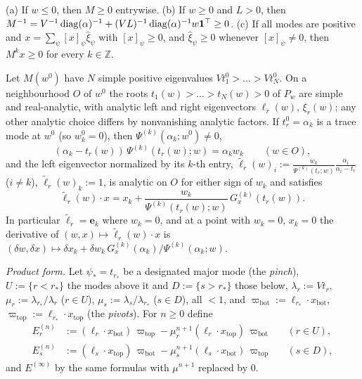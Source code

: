 \documentclass[11pt,a4paper]{report}
\newcommand{\one}{\mathbf 1}
\newcommand{\bfe}{\mathbf e}
\newcommand{\xb}{x_{\mathrm{bot}}}
\newcommand{\xt}{x_{\mathrm{top}}}
\newcommand{\piv}{\varpi}
\begin{document}
\begin{lemma}\label{lem:positive}
(a) If \(w\le0\), then \(M\ge0\) entrywise. (b) If \(w\ge0\) and \(L>0\), then
\(M^{-1}=V^{-1}\diag(\alpha)^{-1}+(VL)^{-1}\diag(\alpha)^{-1}w\one^\top\ge0\). (c) If all modes are positive and
\(x=\sum_\psi[x]_\psi\hat\xi_\psi\) with \([x]_\psi\ge0\), and \(\hat\xi_\psi\ge0\) whenever \([x]_\psi\ne0\), then \(M^kx\ge0\) for every
\(k\in\mathbb Z\).
\end{lemma}

\begin{lemma}\label{lem:analytic}
Let \(M(w^0)\) have \(N\) simple positive eigenvalues \(Vt^0_1>\dots>Vt^0_N\). On a neighbourhood \(O\) of \(w^0\) the roots
\(t_1(w)>\dots>t_N(w)>0\) of \(P_w\) are simple and real-analytic, with analytic left and right eigenvectors \(\ell_r(w)\),
\(\xi_r(w)\); any other analytic choice differs by nonvanishing analytic factors. If \(t^0_r=\alpha_k\) is a trace mode at
\(w^0\) (so \(w^0_k=0\)), then \(\Psi^{(k)}(\alpha_k;w^0)\ne0\),
\begin{equation}\label{eq:traceroot}
(\alpha_k-t_r(w))\,\Psi^{(k)}(t_r(w);w)=\alpha_kw_k\qquad(w\in O),
\end{equation}
and the left eigenvector normalized by its \(k\)-th entry,
\(\tilde\ell_r(w)_i:=\frac{w_k}{\Psi^{(k)}(t_r;w)}\frac{\alpha_i}{\alpha_i-t_r}\) (\(i\ne k\)), \(\tilde\ell_r(w)_k:=1\), is analytic on
\(O\) for either sign of \(w_k\) and satisfies
\begin{equation}\label{eq:regtrace}
\tilde\ell_r(w)\cdot x=x_k+\frac{w_k}{\Psi^{(k)}(t_r(w);w)}\,G^{(k)}_x(t_r(w)).
\end{equation}
In particular \(\tilde\ell_r=\bfe_k\) where \(w_k=0\), and at a point with \(w_k=0\), \(x_k=0\) the derivative of
\((w,x)\mapsto\tilde\ell_r(w)\cdot x\) is \((\delta w,\delta x)\mapsto\delta x_k+\delta w_k\,G^{(k)}_x(\alpha_k)/\Psi^{(k)}(\alpha_k;w)\).
\end{lemma}

\emph{Product form.} Let \(\psi_*=t_{r_*}\) be a designated major mode (the \emph{pinch}), \(U:=\{r<r_*\}\) the modes above it and
\(D:=\{s>r_*\}\) those below, \(\lambda_r:=Vt_r\), \(\mu_r:=\lambda_{r_*}/\lambda_r\) (\(r\in U\)), \(\mu_s:=\lambda_s/\lambda_{r_*}\)
(\(s\in D\)), all \(<1\), and \(\piv_{\mathrm{bot}}:=\ell_{r_*}\cdot\xb\), \(\piv_{\mathrm{top}}:=\ell_{r_*}\cdot\xt\) (the \emph{pivots}).
For \(n\ge0\) define
\begin{equation}\label{eq:productform}
\begin{aligned}
E^{(n)}_r&:=(\ell_r\cdot\xb)\,\piv_{\mathrm{top}}-\mu_r^{n+1}(\ell_r\cdot\xt)\,\piv_{\mathrm{bot}}&&(r\in U),\\
E^{(n)}_s&:=(\ell_s\cdot\xt)\,\piv_{\mathrm{bot}}-\mu_s^{n+1}(\ell_s\cdot\xb)\,\piv_{\mathrm{top}}&&(s\in D),
\end{aligned}
\end{equation}
and \(E^{(\infty)}\) by the same formulas with \(\mu^{n+1}\) replaced by \(0\).
\end{document}
